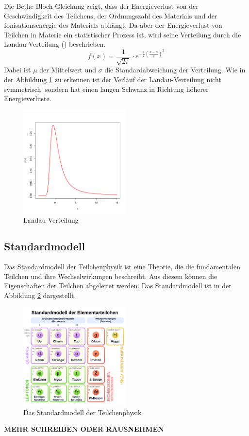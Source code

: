 \documentclass{article}
\begin{document}
Die Bethe-Bloch-Gleichung zeigt, dass der Energieverlust von der Geschwindigkeit des Teilchens, der Ordnungszahl des Materials und der Ionisationsenergie des Materials abhängt.
Da aber der Energieverlust von Teilchen in Materie ein statistischer Prozess ist, wird seine Verteilung durch die Landau-Verteilung (\cite{Landau}) beschrieben.
\begin{equation*}
    f(x) = \frac{1}{\sqrt{2\pi}} \cdot e^{-\frac{1}{2} \left(\frac{x - \mu}{\sigma}\right)^2}    
\end{equation*}
Dabei ist $\mu$ der Mittelwert und $\sigma$ die Standardabweichung der Verteilung.
Wie in der Abbildung \ref{fig:Landau} zu erkennen ist der Verlauf der Landau-Verteilung nicht symmetrisch, sondern hat einen langen Schwanz in Richtung höherer Energieverluste.
\begin{figure}[H]
    \centering
    \includegraphics[width=0.5\textwidth]{figures/Landau.png}
    \caption{Landau-Verteilung \cite{Landau}}
    \label{fig:Landau}
\end{figure}

\subsection{Standardmodell}
Das Standardmodell der Teilchenphysik ist eine Theorie, die die fundamentalen Teilchen und ihre Wechselwirkungen beschreibt.
Aus diesem können die Eigenschaften der Teilchen abgeleitet werden. Das Standardmodell ist in der Abbildung \ref{fig:Standardmodell} dargestellt.
\begin{figure}[H]
    \centering
    \includegraphics[width=0.5\textwidth]{figures/Standardmodell.png}
    \caption{Das Standardmodell der Teilchenphysik \cite{Standardmodell}}
    \label{fig:Standardmodell} 
\end{figure}
\textbf{\color{red}MEHR SCHREIBEN ODER RAUSNEHMEN}
\end{document}

